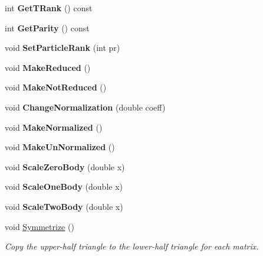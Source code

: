 \begin{DoxyCompactItemize}
int {\bfseries Get\+T\+Rank} () const
\item 
\mbox{\label{classOperator_a6c99a77d6cb3506fc4129caee5ab3714}} 
int {\bfseries Get\+Parity} () const
\item 
\mbox{\label{classOperator_a77eb97b1309a1c4e20101217903b9771}} 
void {\bfseries Set\+Particle\+Rank} (int pr)
\item 
\mbox{\label{classOperator_ad2ec2d4cf6d17b1b7b7afc86bc03c6ed}} 
void {\bfseries Make\+Reduced} ()
\item 
\mbox{\label{classOperator_add4e26b5eb6534daed5cd40899456ed0}} 
void {\bfseries Make\+Not\+Reduced} ()
\item 
\mbox{\label{classOperator_a4a4ebafd34f06272c1b207d61a5cfd2d}} 
void {\bfseries Change\+Normalization} (double coeff)
\item 
\mbox{\label{classOperator_a64c6b761468d1983610c5c9d26f84222}} 
void {\bfseries Make\+Normalized} ()
\item 
\mbox{\label{classOperator_a93511274ce2cc52d0facb2a38fae91af}} 
void {\bfseries Make\+Un\+Normalized} ()
\item 
\mbox{\label{classOperator_a3a25803bc77344396f2dd0e75d2a020d}} 
void {\bfseries Scale\+Zero\+Body} (double x)
\item 
\mbox{\label{classOperator_a5466cc965277b75b14b60918f4d652ab}} 
void {\bfseries Scale\+One\+Body} (double x)
\item 
\mbox{\label{classOperator_af1f244c4856d11c21f94b6c6cd24a555}} 
void {\bfseries Scale\+Two\+Body} (double x)
\item 
\mbox{\label{classOperator_a98d4075d734523186162492a4a45b420}} 
void \hyperlink{classOperator_a98d4075d734523186162492a4a45b420}{Symmetrize} ()
\begin{DoxyCompactList}\small\item\em Copy the upper-\/half triangle to the lower-\/half triangle for each matrix. \end{DoxyCompactList}\item 

\end{DoxyCompactItemize}
